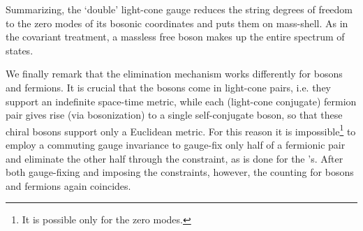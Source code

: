 \documentclass[a4paper,11pt]{article}
\def\N2{\myHighlight{$N{=}2$}\coordHE{}}
\begin{document}
Summarizing, the `double' light-cone gauge reduces the \N2 string
degrees of freedom to the zero modes of its bosonic coordinates
and puts them on mass-shell. As in the covariant treatment, 
a massless free boson makes up the entire spectrum of states.

We finally remark that the elimination mechanism works differently for bosons 
and fermions. It is crucial that the bosons come in light-cone pairs, i.e.
they support an indefinite space-time metric, while each (light-cone conjugate)
fermion pair gives rise (via bosonization) to a single self-conjugate boson,
so that these chiral bosons support only a Euclidean metric.
For this reason it is impossible\footnote{
It is possible only for the zero modes.} 
to employ a commuting gauge invariance to gauge-fix only half 
of a fermionic pair and eliminate the other half through the constraint, 
as is done for the \coordHE{}'s.
After both gauge-fixing and imposing the constraints, however, the counting
for bosons and fermions again coincides.
\\
\end{document}
